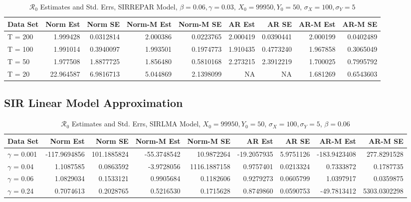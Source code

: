 \message{ !name(draft_v13.tex)}\documentclass[12pt]{article}
\newcommand{\rr}{\ensuremath{\mathcal{R}_0}}
\begin{document}
\begin{table}[H]
	
	\caption{\label{tab:}$\rr$ Estimates and Std. Errs, SIRREPAR Model,
		$\beta = 0.06, \gamma = 0.03$, $X_0 = 99950, Y_0 = 50$, $\sigma_X = 100, \sigma_Y = 5$}
	\centering
	\begin{tabular}[t]{l|r|r|r|r|r|r|r|r}
		\hline
		Data Set & Norm Est & Norm SE & Norm-M Est & Norm-M SE & AR Est & AR SE & AR-M Est & AR-M SE\\
		\hline
		T = 200 & 1.999428 & 0.0312814 & 2.000386 & 0.0223765 & 2.000419 & 0.0390441 & 2.000199 & 0.0402489\\
		\hline
		T = 100 & 1.991014 & 0.3940097 & 1.993501 & 0.1974773 & 1.910435 & 0.4773240 & 1.967858 & 0.3065049\\
		\hline
		T = 50 & 1.977508 & 1.8877725 & 1.856480 & 0.5810168 & 2.273215 & 2.3912219 & 1.700025 & 0.7995792\\
		\hline
		T = 20 & 22.964587 & 6.9816713 & 5.044869 & 2.1398099 & NA & NA & 1.681269 & 0.6543603\\
		\hline
	\end{tabular}
\end{table}

\subsection{SIR Linear Model Approximation}

\begin{table}[H]
	
	\caption{\label{tab:}$\rr$ Estimates and Std. Errs, SIRLMA Model,
		$X_0 = 99950, Y_0 = 50$, $\sigma_X = 100, \sigma_Y = 5$, $\beta = 0.06$}
	\centering
	\begin{footnotesize}
		\begin{tabular}[t]{l|r|r|r|r|r|r|r|r}
			\hline
			Data Set & Norm Est & Norm SE & Norm-M Est & Norm-M SE & AR Est & AR SE & AR-M Est & AR-M SE\\
			\hline
			$\gamma$ = 0.001 & -117.9694856 & 101.1885824 & -55.3748542 & 10.9872264 & -19.2057935 & 5.9751126 & -183.9423408 & 277.8291528\\
			\hline
			$\gamma$ = 0.04 & 1.1087585 & 0.0863592 & -3.9728056 & 1116.1887158 & 0.9757401 & 0.0213324 & 0.7333872 & 0.1787735\\
			\hline
			$\gamma$ = 0.06 & 1.0829034 & 0.1533121 & 0.9905684 & 0.1182606 & 0.9279273 & 0.0605799 & 1.0397917 & 0.0359875\\
			\hline
			$\gamma$ = 0.24 & 0.7074613 & 0.2028765 & 0.5216530 & 0.1715628 & 0.8749860 & 0.0590753 & -49.7813412 & 5303.0302298\\
			\hline
		\end{tabular}
	\end{footnotesize}
\end{table}
\end{document}
